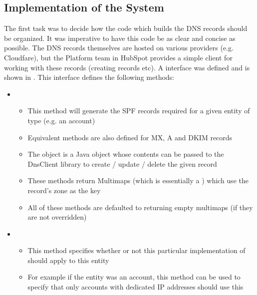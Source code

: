 \subsection{Implementation of the System}
The first task was to decide how the code which builds the DNS records should be organized. It was imperative to have this code be as clear and concise as possible. The DNS records themselves are hosted on various providers (e.g. Cloudfare), but the Platform team in HubSpot provides a simple client for working with these records (creating records etc). A  interface was defined and is shown in  . This interface defines the following methods:

\begin{itemize}

      \item{}
      \begin{itemize}
            \item{This method will generate the SPF records required for a given entity of type  (e.g. an account)}
            \item{Equivalent methods are also defined for MX, A and DKIM records}
            \item{The  object is a Java object whose contents can be passed to the DnsClient library to create / update / delete the given record}
            \item{These methods return Multimaps (which is essentially a ) which use the record's zone as the key}
            \item{All of these methods are defaulted to returning empty multimaps (if they are not overridden)}
      \end{itemize}

      \item{}
      \begin{itemize}
            \item{This method specifies whether or not this particular implementation of  should apply to this entity}
            \item{For example if the entity was an account, this method can be used to specify that only accounts with dedicated IP addresses should use this }
      \end{itemize}


\end{itemize}
